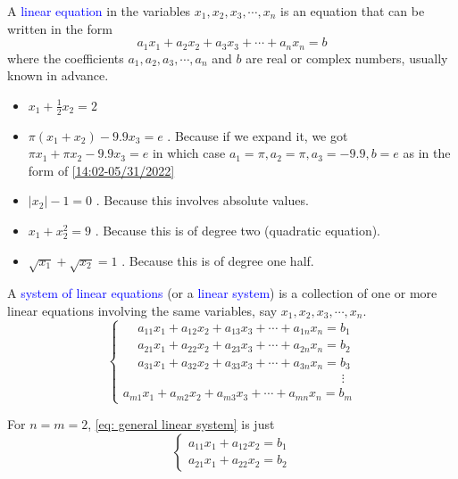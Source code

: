 \documentclass{beamer}
\theoremstyle{definition}
\theoremstyle{remark}
\begin{document}
\begin{frame}[t]
\begin{definition}
A \textcolor{blue}{linear equation} in the variables $x_1,x_2,x_3,\cdots,x_n$ is an equation that can be written in the form 
\begin{equation}\label{14:02-05/31/2022}
a_1x_1+a_2x_2+a_3x_3+\cdots+a_nx_n=b
\end{equation}
where the coefficients $a_1,a_2,a_3,\cdots,a_n$ and $b$ are real or complex numbers, usually known in advance.
\end{definition}
\pause
\begin{example}\hfill
\begin{itemize}
\item $x_1+\frac{1}{2}x_2=2$ \pause{}
\item $\pi(x_1+x_2)-9.9x_3=e$ \pause{}. Because if we expand it, we got $\pi x_1+\pi x_2-9.9x_3=e$ in which case $a_1=\pi,a_2=\pi,a_3=-9.9,b=e$ as in the form of \eqref{14:02-05/31/2022}
\item $|x_2|-1=0$ \pause{}. Because this involves absolute values.
\item $x_1+x_2^2=9$ \pause{}. Because this is of degree two (quadratic equation).
\item $\sqrt{x_1}+\sqrt{x_2}=1$ \pause{}. Because this is of degree one half.
\end{itemize}
\end{example}
\end{frame}

\begin{frame}[t]
\begin{definition}
A \textcolor{blue}{system of linear equations} (or a \textcolor{blue}{linear system}) is a collection of one or more linear equations involving the same variables, say $x_1,x_2,x_3,\cdots,x_n$.
\begin{equation}\label{eq: general linear system}
\begin{cases}
\,\quad a_{11}x_1+a_{12}x_2+a_{13}x_3+\cdots+a_{1n}x_{n}=b_1 \\
\,\quad a_{21}x_1+a_{22}x_2+a_{23}x_3+\cdots+a_{2n}x_{n}=b_2 \\
\quad \,a_{31}x_1+a_{32}x_2+a_{33}x_3+\cdots+a_{3n}x_{n}=b_3 \\
\,\,\,\qquad\qquad\qquad\qquad\qquad\qquad\qquad\qquad\quad\vdots \\
a_{m1}x_1+a_{m2}x_2+a_{m3}x_3+\cdots+a_{mn}x_{n}=b_m
\end{cases}
\end{equation}
\end{definition}
\pause
\begin{example}
For $n=m=2$, \eqref{eq: general linear system} is just
\begin{equation}\label{eq: general 2 by 2 linear system}
\begin{cases}
a_{11}x_1+a_{12}x_2=b_1\\
a_{21}x_1+a_{22}x_2=b_2
\end{cases}
\end{equation}
\end{example}
\end{frame}
\end{document}
